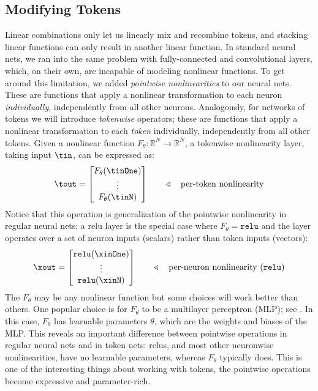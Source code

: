 \subsection{Modifying Tokens}\label{sec:transformers:modifying_tokens}
Linear combinations only let us linearly mix and recombine tokens, and stacking linear functions can only result in another linear function. In standard neural nets, we ran into the same problem with fully-connected and convolutional layers, which, on their own, are incapable of modeling nonlinear functions. To get around this limitation, we added \textit{pointwise nonlinearities} to our neural nets. These are functions that apply a nonlinear transformation to each neuron \textit{individually}, independently from all other neurons. Analogously, for networks of tokens we will introduce \textit{tokenwise} operators; these are functions that apply a nonlinear transformation to each \textit{token} individually, independently from all other tokens. Given a nonlinear function $F_{\theta}: \mathbb{R}^N \rightarrow \mathbb{R}^N$, a tokenwise nonlinearity layer, taking input $\tin$, can be expressed as:
\begin{align}
    \tout =
    \begin{bmatrix}
        F_{\theta}(\tinOne) \\
        \vdots              \\
        F_{\theta}(\tinN)   \\
    \end{bmatrix}\quad\quad \triangleleft \quad\text{per-token nonlinearity}
\end{align}
Notice that this operation is generalization of the pointwise nonlinearity in regular neural nets; a relu layer is the special case where $F_{\theta} = \texttt{relu}$ and the layer operates over a set of neuron inputs (scalars) rather than token inputs (vectors):
\begin{align}
    \xout =
    \begin{bmatrix}
        \texttt{relu}(\xinOne) \\
        \vdots                 \\
        \texttt{relu}(\xinN)   \\
    \end{bmatrix}\quad\quad \triangleleft \quad\text{per-neuron nonlinearity (\texttt{relu})}
\end{align}
The $F_{\theta}$ may be any nonlinear function but some choices will work better than others. One popular choice is for $F_{\theta}$ to be a multilayer perceptron (MLP); see \chap{\ref{chapter:neural_nets}}. In this case, $F_{\theta}$ has learnable parameters $\theta$, which are the weights and biases of the MLP. This reveals an important difference between pointwise operations in regular neural nets and in token nets: relus, and most other neuronwise nonlinearities, have no learnable parameters, whereas $F_{\theta}$ typically does. This is one of the interesting things about working with tokens, the pointwise operations become expressive and parameter-rich.

